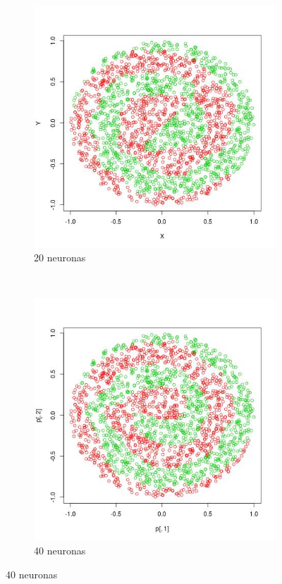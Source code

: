 \documentclass[12pt, a4paper]{article}
\begin{document}
\begin{figure}
      ~ %
    \begin{subfigure}[b]{0.4\textwidth}
        \includegraphics[width=\textwidth]{prediccion4}
        \caption{20 neuronas}
    \end{subfigure}
    ~ %
    \begin{subfigure}[b]{0.4\textwidth}
        \includegraphics[width=\textwidth]{prediccion5}
        \caption{40 neuronas}
    \end{subfigure}
        

\end{figure}
\end{document}
